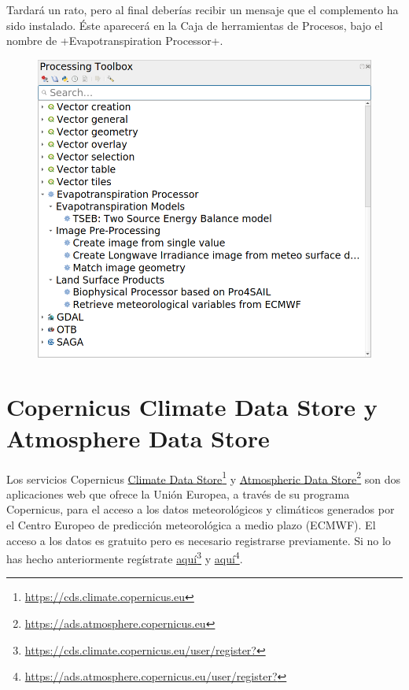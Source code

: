 \documentclass[a4paper,11pt]{article}
\begin{document}
Tardará un rato, pero al final deberías recibir un mensaje que el complemento ha sido instalado. Éste aparecerá en la Caja de herramientas de Procesos, bajo el nombre de \cverb+Evapotranspiration Processor+.
 \begin{figure}[H]\centering
  \includegraphics[width=\textwidth]{qgis_et_model_provider}
 \end{figure}


\section{Copernicus Climate Data Store y Atmosphere Data Store}\label{sec:ecmwf}
Los servicios Copernicus \href{https://cds.climate.copernicus.eu}{Climate Data Store}\footnote{\url{https://cds.climate.copernicus.eu}} y \href{https://ads.atmosphere.copernicus.eu}{Atmospheric Data Store}\footnote{\url{https://ads.atmosphere.copernicus.eu}} son dos aplicaciones web que ofrece la Unión Europea, a través de su programa Copernicus, para el acceso a los datos meteorológicos y climáticos generados por el Centro Europeo de predicción meteorológica a medio plazo (ECMWF). El acceso a los datos es gratuito pero es necesario registrarse previamente. Si no lo has hecho anteriormente regístrate \href{https://cds.climate.copernicus.eu/user/register?}{aquí}\footnote{\url{https://cds.climate.copernicus.eu/user/register?}} y \href{https://ads.atmosphere.copernicus.eu/user/register?}{aquí}\footnote{\url{https://ads.atmosphere.copernicus.eu/user/register?}}. 
\end{document}
